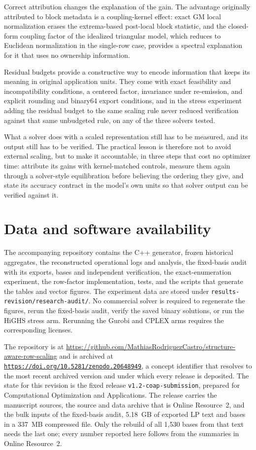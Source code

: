 \documentclass[smallextended,envcountsect,envcountsame]{svjour3}
\newcommand{\doi}[1]{\href{https://doi.org/#1}{\nolinkurl{https://doi.org/#1}}}
\begin{document}
Correct attribution changes the explanation of the gain. The advantage originally attributed to
block metadata is a coupling-kernel effect: exact GM local normalization erases the
extrema-based post-local block statistic, and the closed-form coupling factor of the idealized
triangular model, which reduces to Euclidean normalization in the single-row case, provides a
spectral explanation for it that uses no ownership information.

Residual budgets provide a constructive way to encode information that keeps its meaning in
original application units. They come with exact feasibility and incompatibility conditions, a
centered factor, invariance under re-emission, and explicit rounding and binary64 export
conditions, and in the stress experiment adding the residual budget to the same scaling rule
never reduced verification against that same unbudgeted rule, on any of the three solvers
tested.

What a solver does with a scaled representation still has to be measured, and its output still
has to be verified. The practical lesson is therefore not to avoid external scaling, but to make
it accountable, in three steps that cost no optimizer time: attribute its gains with
kernel-matched controls, measure them again through a solver-style equilibration before
believing the ordering they give, and state its accuracy contract in the model's own units so
that solver output can be verified against it.

\section*{Data and software availability}
The accompanying repository contains the C++ generator, frozen historical aggregates, the
reconstructed operational logs and analysis, the fixed-basis audit with its exports, bases and
independent verification, the exact-enumeration experiment, the row-factor implementation,
tests, and the scripts that generate the tables and vector figures. The experiment data are
stored under
\texttt{results-revision/research-audit/}. No commercial solver is required to regenerate the
figures, rerun the fixed-basis audit, verify the saved binary solutions, or run the HiGHS stress
arm. Rerunning the Gurobi and CPLEX arms requires the corresponding licenses.

The repository is at \url{https://github.com/MathiasRodriguezCastro/structure-aware-row-scaling}
and is archived at \doi{10.5281/zenodo.20648949}, a concept identifier that resolves to the
most recent archived version and under which every release is deposited.
The state for this revision is the fixed release \texttt{v1.2-coap-submission}, prepared for
Computational Optimization and Applications. The release carries the manuscript sources,
the source and data archive that is Online Resource~2, and the
bulk inputs of the fixed-basis audit, 5.18~GB of exported LP text and bases in a 337~MB
compressed file. Only the rebuild of all 1,530 bases from that text needs the last one; every
number reported here follows from the summaries in Online Resource~2.
\end{document}
